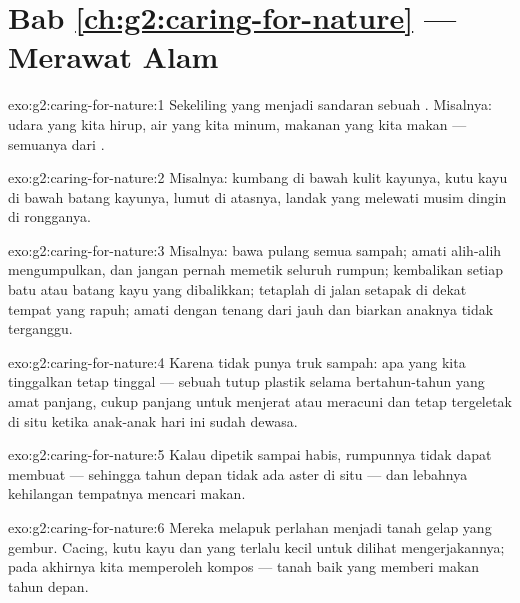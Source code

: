 \section*{Bab \ref{ch:g2:caring-for-nature} --- Merawat Alam}

\begin{solution}{exo:g2:caring-for-nature:1}
Sekeliling yang menjadi sandaran sebuah . Misalnya: udara
yang kita hirup, air yang kita minum, makanan yang kita makan ---
semuanya dari .
\end{solution}

\begin{solution}{exo:g2:caring-for-nature:2}
Misalnya: kumbang di bawah kulit kayunya, kutu kayu di bawah batang
kayunya, lumut di atasnya, landak yang melewati musim dingin di
rongganya.
\end{solution}

\begin{solution}{exo:g2:caring-for-nature:3}
Misalnya: bawa pulang semua sampah; amati alih-alih mengumpulkan, dan
jangan pernah memetik seluruh rumpun; kembalikan setiap batu atau
batang kayu yang dibalikkan; tetaplah di jalan setapak di dekat tempat
yang rapuh; amati  dengan tenang dari jauh dan biarkan anaknya
tidak terganggu.
\end{solution}

\begin{solution}{exo:g2:caring-for-nature:4}
Karena  tidak punya truk sampah: apa yang kita tinggalkan tetap
tinggal --- sebuah tutup plastik selama bertahun-tahun yang amat
panjang, cukup panjang untuk menjerat atau meracuni  dan tetap
tergeletak di situ ketika anak-anak hari ini sudah dewasa.
\end{solution}

\begin{solution}{exo:g2:caring-for-nature:5}
Kalau dipetik sampai habis, rumpunnya tidak dapat membuat  ---
sehingga tahun depan tidak ada  aster di situ --- dan lebahnya
kehilangan  tempatnya mencari makan.
\end{solution}

\begin{solution}{exo:g2:caring-for-nature:6}
Mereka melapuk perlahan menjadi tanah gelap yang gembur. Cacing, kutu
kayu dan  yang terlalu kecil untuk dilihat mengerjakannya;
pada akhirnya kita memperoleh kompos --- tanah baik yang memberi makan
 tahun depan.
\end{solution}

